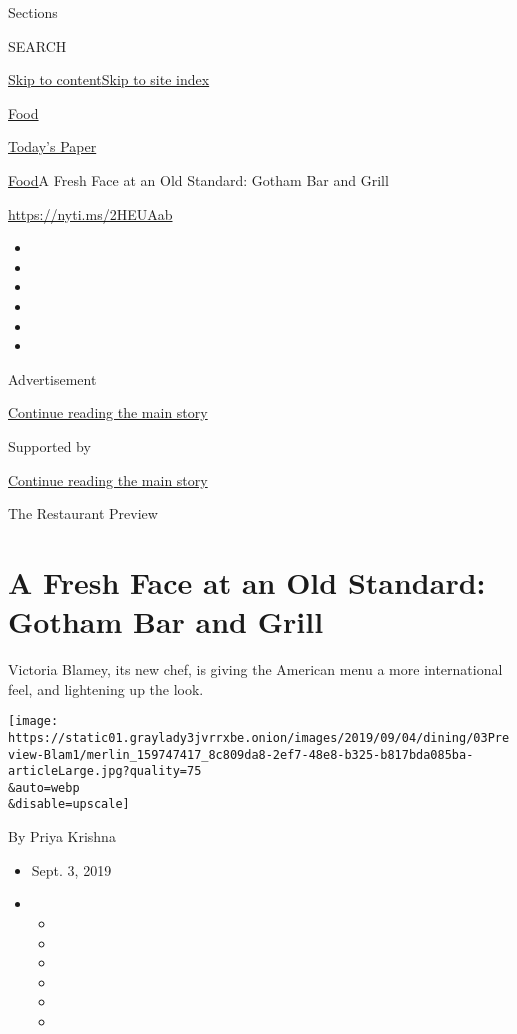 Sections

SEARCH

\protect\hyperlink{site-content}{Skip to
content}\protect\hyperlink{site-index}{Skip to site index}

\href{https://www.nytimes3xbfgragh.onion/section/food}{Food}

\href{https://myaccount.nytimes3xbfgragh.onion/auth/login?response_type=cookie\&client_id=vi}{}

\href{https://www.nytimes3xbfgragh.onion/section/todayspaper}{Today's
Paper}

\href{/section/food}{Food}\textbar{}A Fresh Face at an Old Standard:
Gotham Bar and Grill

\url{https://nyti.ms/2HEUAab}

\begin{itemize}
\item
\item
\item
\item
\item
\item
\end{itemize}

Advertisement

\protect\hyperlink{after-top}{Continue reading the main story}

Supported by

\protect\hyperlink{after-sponsor}{Continue reading the main story}

The Restaurant Preview

\hypertarget{a-fresh-face-at-an-old-standard-gotham-bar-and-grill}{%
\section{A Fresh Face at an Old Standard: Gotham Bar and
Grill}\label{a-fresh-face-at-an-old-standard-gotham-bar-and-grill}}

Victoria Blamey, its new chef, is giving the American menu a more
international feel, and lightening up the look.

\texttt{[image: https://static01.graylady3jvrrxbe.onion/images/2019/09/04/dining/03Preview-Blam1/merlin\_159747417\_8c809da8-2ef7-48e8-b325-b817bda085ba-articleLarge.jpg?quality=75\\\&auto=webp\\\&disable=upscale]}

By Priya Krishna

\begin{itemize}
\item
  Sept. 3, 2019
\item
  \begin{itemize}
  \item
  \item
  \item
  \item
  \item
  \item
  \end{itemize}
\end{itemize}

